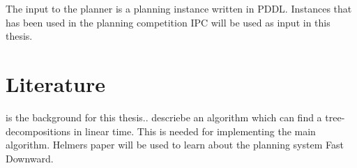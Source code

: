 \documentclass{article}
\begin{document}
The input to the planner is a planning instance written in PDDL. Instances that has been used in the planning competition IPC will be used as input in this thesis.

\section{Literature}


\cite{Backstrom2014a} is the background for this thesis..
\cite{Bodlaender1993} descriebe an algorithm which can find a tree-decompositions in linear time. This is needed for implementing the main algorithm.
Helmers paper \cite{Helmert2006} will be used to learn about the planning system Fast Downward.




\end{document}
